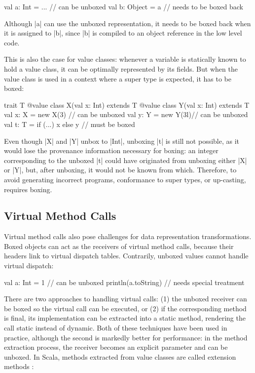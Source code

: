 \begin{lstlisting-nobreak}
 val a: Int = ...        // can be unboxed
 val b: Object = a // needs to be boxed back
\end{lstlisting-nobreak}

Although |a| can use the unboxed representation, it needs to be boxed back when it is assigned to |b|, since |b| is compiled to an object reference in the low level code.

This is also the case for value classes: whenever a variable is statically known to hold a value class, it can be optimally represented by its fields. But when the value class is used in a context where a super type is expected, it has to be boxed:

\begin{lstlisting-nobreak}
 trait T
 @value class X(val x: Int) extends T
 @value class Y(val x: Int) extends T
 val x: X = new X(3)  // can be unboxed
 val y: Y = new Y(3l)// can be unboxed
 val t: T = if (...) x else y // must be boxed
\end{lstlisting-nobreak}

Even though |X| and |Y| unbox to |Int|, unboxing |t| is still not possible, as it would lose the provenance information necessary for boxing: an integer corresponding to the unboxed |t| could have originated from unboxing either |X| or |Y|, but, after unboxing, it would not be known from which. Therefore, to avoid generating incorrect programs, conformance to super types, or up-casting, requires boxing.

\subsection{Virtual Method Calls}
\label{ldl:sec:problem-oo/virtual-method-calls}

Virtual method calls also pose challenges for data representation transformations. Boxed objects can act as the receivers of virtual  method calls, because their headers link to virtual dispatch tables. Contrarily, unboxed values cannot handle virtual dispatch:

\begin{lstlisting-nobreak}
 val a: Int = 1             // can be unboxed
 println(a.toString) // needs special treatment
\end{lstlisting-nobreak}

There are two approaches to handling virtual calls: (1) the unboxed receiver can be boxed so the virtual call can be executed, or (2) if the corresponding method is final, its implementation can be extracted into a static method, rendering the call static instead of dynamic. Both of these techniques have been used in practice, although the second is markedly better for performance: in the method extraction process, the receiver becomes an explicit parameter and can be unboxed. In Scala, methods extracted from value classes are called extension methods \cite{sip-value-classes}:

